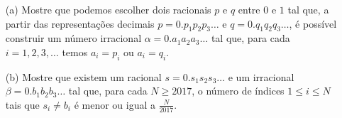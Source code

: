 \mbox{}
\begin{itemize}
	\item[(a)] Mostre que podemos escolher dois racionais $p$ e $q$ entre $0$ e $1$ tal que, a partir das representações decimais $p = 0.p_1p_2p_3\dots$ e $q = 0.q_1q_2q_3\dots$, é possível construir um número irracional $\alpha = 0.a_1a_2a_3\dots$ tal que, para cada $i = 1, 2, 3, \dots$ temos $a_i = p_i$ ou $a_i = q_i$.

	\item[(b)] Mostre que existem um racional $s = 0.s_1s_2s_3\dots$ e um irracional $\beta = 0.b_1b_2b_3\dots$ tal que, para cada $N \geq 2017$, o número de índices $1 \leq i \leq N$ tais que $s_i \neq b_i$ é menor ou igual a $\frac{N}{2017}$.
\end{itemize}
